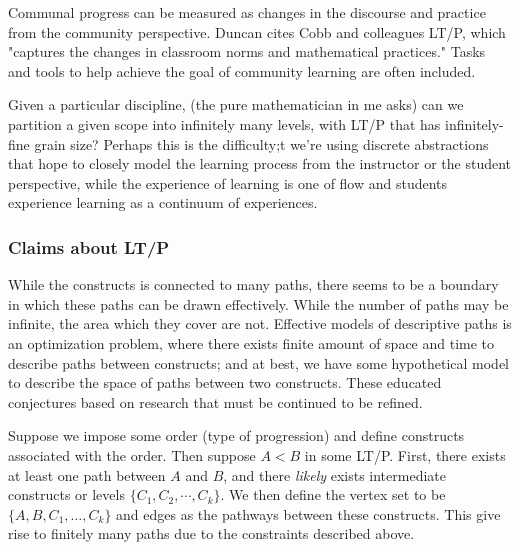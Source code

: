 \documentclass{TC}
\begin{document}
\begin{mdframed}
\begin{definition}
Communal progress can be measured as changes in the discourse and practice from the community perspective. Duncan cites Cobb and colleagues LT/P, which "captures the changes in classroom norms and mathematical practices." Tasks and tools to help achieve the goal of community learning are often included. 
\end{definition}
\end{mdframed}
\begin{remark}
Given a particular discipline, (the pure mathematician in me asks) can we partition a given scope into infinitely many levels, with LT/P that has infinitely-fine grain size? Perhaps this is the difficulty;t we're using discrete abstractions that hope to closely model the learning process from the instructor or the student perspective, while the experience of learning is one of flow and students experience learning as a continuum of experiences.
\end{remark}

\subsubsection{Claims about LT/P}
While the constructs is connected to many paths, there seems to be a boundary in which these paths can be drawn effectively. While the number of paths may be infinite, the area which they cover are not. Effective models of descriptive paths is an optimization problem, where there exists finite amount of space and time to describe paths between constructs; and at best, we have some hypothetical model to describe the space of paths between two constructs. These educated conjectures based on research that must be continued to be refined.

\begin{conjecture}
Suppose we impose some order (type of progression) and define constructs associated with the order. Then suppose $A<B$ in some LT/P. First, there exists at least one path between $A$ and $B$, and there \emph{likely} exists intermediate constructs or levels $\{C_1, C_2, \cdots, C_k\}$. We then define the vertex set to be $\{A, B, C_1, \ldots,C_k\}$ and edges as the pathways between these constructs. This give rise to finitely many paths due to the constraints described above. 
\end{conjecture}
\end{document}
